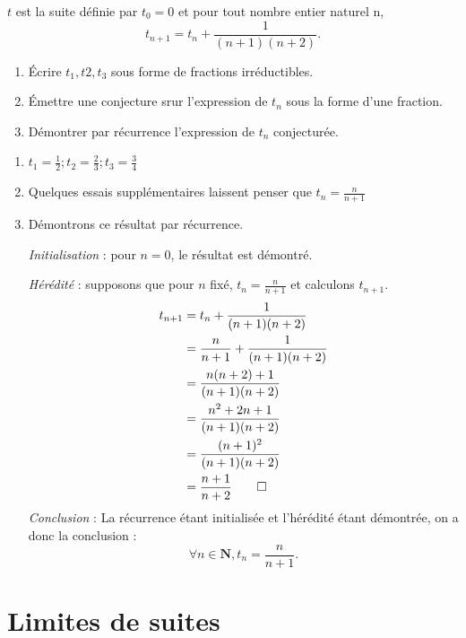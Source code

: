 \documentclass[12pt,a4paper,french]{article}
\newcommand{\N}{\mathbf{N}}
\begin{document}
\begin{question}
  $t$ est la suite définie par $t_0 = 0$ et pour tout nombre entier naturel
  n, \[ t_{n+1} = t_n + \frac1{(n+1)(n+2)} . \]
  \begin{enumerate}
    \item Écrire $t_1, t2, t_3$ sous forme de fractions irréductibles.
    \item Émettre une conjecture srur l'expression de $t_n$ sous la forme
      d'une fraction.
    \item Démontrer par récurrence l'expression de $t_n$ conjecturée.
  \end{enumerate}
\end{question}
\begin{solution}
  \begin{enumerate}
    \item $t_1 = \frac12 ; t_2 = \frac23 ; t_3 = \frac34$
    \item Quelques essais supplémentaires laissent penser que $t_n =
      \frac{n}{n+1}$
    \item Démontrons ce résultat par récurrence.

      \emph{Initialisation} : pour $n = 0$, le résultat est démontré.

      \emph{Hérédité} : supposons que pour $n$ fixé, $t_n =
      \frac{n}{n+1}$ et calculons $t_{n+1}$.
      \begin{align*}
        t_{n+1} & = t_n + \frac1{(n+1)(n+2)}           \\
                & = \frac{n}{n+1} + \frac1{(n+1)(n+2)} \\
                & = \frac{n(n+2) + 1}{(n+1)(n+2)}      \\
                & = \frac{n^2 + 2n + 1}{(n+1)(n+2)}    \\
                & = \frac{(n + 1)^2}{(n+1)(n+2)}       \\
                & = \frac{n+1}{n+2} \qed
      \end{align*}
      \emph{Conclusion} : La récurrence étant initialisée et l'hérédité
      étant démontrée, on a donc la conclusion : \[ \forall n \in \N, t_n =
      \frac{n}{n+1} . \]
  \end{enumerate}
\end{solution}

\section{Limites de suites}
\end{document}
